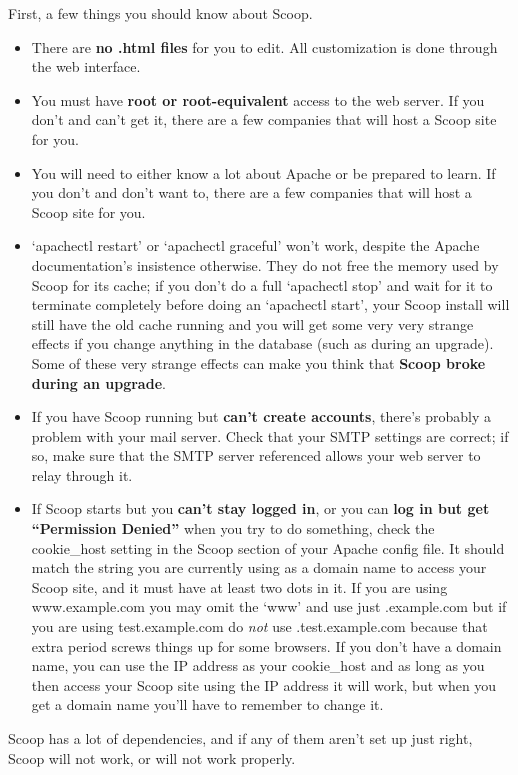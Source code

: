First, a few things you should know about Scoop.  
\begin{itemize}
\item There are {\bf no .html files} for you to edit.  All customization is done through the web interface.
\item You must have {\bf root or root-equivalent} access to the web server.  If you don't and can't get it, there are a few companies that will host a Scoop site for you.
\item You will need to either know a lot about Apache or be prepared to learn. If you don't and don't want to, there are a few companies that will host a Scoop site for you.
\item `apachectl restart' or `apachectl graceful' won't work, despite the Apache documentation's insistence otherwise. They do not free the memory used by Scoop for its cache; if you don't do a full `apachectl stop' and wait for it to terminate completely before doing an `apachectl start', your Scoop install will still have the old cache running and you will get some very very strange effects if you change anything in the database (such as during an upgrade). Some of these very strange effects can make you think that {\bf Scoop broke during an upgrade}.
\item If you have Scoop running but {\bf can't create accounts}, there's probably a problem with your mail server.  Check that your SMTP settings are correct; if so, make sure that the SMTP server referenced allows your web server to relay through it.
\item If Scoop starts but you {\bf can't stay logged in}, or you can {\bf log in but get ``Permission Denied''} when you try to do something, check the cookie\_host setting in the Scoop section of your Apache config file.  It should match the string you are currently using as a domain name to access your Scoop site, and it must have at least two dots in it.  If you are using www.example.com you may omit the `www' and use just .example.com but if you are using test.example.com do {\em not} use .test.example.com because that extra period screws things up for some browsers.  If you don't have a domain name, you can use the IP address as your cookie\_host and as long as you then access your Scoop site using the IP address it will work, but when you get a domain name you'll have to remember to change it.
\end{itemize} 

Scoop has a lot of dependencies, and if any of them aren't set up just right, Scoop will not work, or will not work properly.

